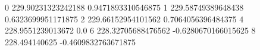 0 229.90231323242188 0.9471893310546875
1 229.58749389648438 0.6323699951171875
2 229.66152954101562 0.7064056396484375
4 228.9551239013672 0.0
6 228.32705688476562 -0.6280670166015625
8 228.494140625 -0.4609832763671875
